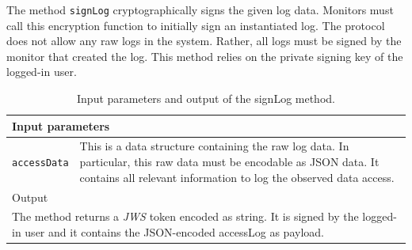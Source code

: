 \documentclass[../main.tex]{subfiles}
\begin{document}
The method \verb|signLog| cryptographically signs the given log data.
Monitors must call this encryption function to initially sign an instantiated log.
The protocol does not allow any raw logs in the system.
Rather, all logs must be signed by the monitor that created the log. 
This method relies on the private signing key of the logged-in user.
\begin{table}[ht]
    \centering
    \begin{tabular}{|p{3cm}p{10cm}|}
        \hline
        \multicolumn{2}{|l|}{Input parameters}    \\ \hline
        \verb|accessData|              & This is a data structure containing the raw log data. In particular, this raw data must be encodable as JSON data. It contains all relevant information to log the observed data access.           \\ \hline
        \multicolumn{2}{|l|}{Output}   \\ \hline
        \multicolumn{2}{|p{13cm}|}{The method returns a \emph{JWS} token encoded as string. It is signed by the logged-in user and it contains the JSON-encoded accessLog as payload.} \\ \hline
    \end{tabular} 
    \caption[Signature of signLog]{Input parameters and output of the signLog method.}
\end{table}
\end{document}
